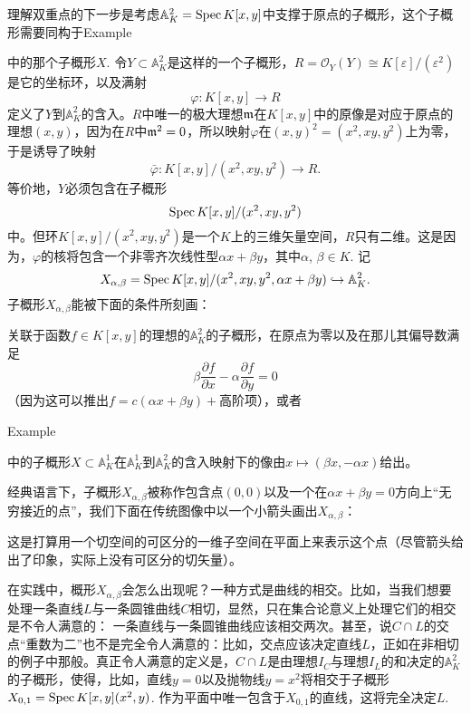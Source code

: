 \begin{exa}[双重点]
理解双重点的下一步是考虑$\mathbb{A}_K^2=\operatorname{Spec} K[x,y]$中支撑于原点的子概形，这个子概形需要同构于Example {{\addtocounter{thm}{-1}}\thethm{\addtocounter{thm}{1}}}中的那个子概形$X$. 令$Y\subset \mathbb{A}_K^2$是这样的一个子概形，$R=\mathscr{O}_Y(Y)\cong K[\varepsilon]/(\varepsilon^2)$是它的坐标环，以及满射
\[
	\varphi:K[x,y]\to R
\]
定义了$Y$到$\mathbb{A}_K^2$的含入。$R$中唯一的极大理想$\mathfrak{m}$在$K[x,y]$中的原像是对应于原点的理想$(x,y)$，因为在$R$中$\mathfrak{m}^2=0$，所以映射$\varphi$在$(x,y)^2=(x^2,xy,y^2)$上为零，于是诱导了映射
\[
	\bar\varphi:K[x,y]/(x^2,xy,y^2)\to R.
\]
等价地，$Y$必须包含在子概形
\[
	\operatorname{Spec} K[x,y]/(x^2,xy,y^2)
\]
中。但环$K[x,y]/(x^2,xy,y^2)$是一个$K$上的三维矢量空间，$R$只有二维。这是因为，$\varphi$的核将包含一个非零齐次线性型$\alpha x+\beta y$，其中$\alpha$, $\beta\in K$. 记
\[
	X_{\alpha,\beta}=\operatorname{Spec} K[x,y]/(x^2,xy,y^2,\alpha x+\beta y)\hookrightarrow \mathbb{A}_K^2.
\]
子概形$X_{\alpha,\beta}$能被下面的条件所刻画：

\begin{compactenum}[(i)]
\item 关联于函数$f\in K[x,y]$的理想的$\mathbb{A}^2_K$的子概形，在原点为零以及在那儿其偏导数满足
\[
	\beta\frac{\partial f}{\partial x}-\alpha\frac{\partial f}{\partial y}=0
\]
（因为这可以推出$f=c(\alpha x+\beta y)+\text{高阶项}$），或者
\item Example {{\addtocounter{thm}{-1}}\thethm{\addtocounter{thm}{1}}}中的子概形$X\subset \mathbb{A}_K^1$在$\mathbb{A}_K^1$到$\mathbb{A}_K^2$的含入映射下的像由$x\mapsto (\beta x,-\alpha x)$给出。
\end{compactenum}

经典语言下，子概形$X_{\alpha,\beta}$被称作包含点$(0,0)$以及一个在$\alpha x+\beta y=0$方向上“无穷接近的点”，我们下面在传统图像中以一个小箭头画出$X_{\alpha,\beta}$：


\noindent 这是打算用一个切空间的可区分的一维子空间在平面上来表示这个点（尽管箭头给出了印象，实际上没有可区分的切矢量）。\nottran
\end{exa}

在实践中，概形$X_{\alpha,\beta}$会怎么出现呢？一种方式是曲线的相交。比如，当我们想要处理一条直线$L$与一条圆锥曲线$C$相切，显然，只在集合论意义上处理它们的相交是不令人满意的：
一条直线与一条圆锥曲线应该相交两次。甚至，说$C\cap L$的交点“重数为二”也不是完全令人满意的：比如，交点应该决定直线$L$，正如在非相切的例子中那般。真正令人满意的定义是，$C\cap L$是由理想$I_C$与理想$I_L$的和决定的$\mathbb{A}_K^2$的子概形，使得，比如，直线$y=0$以及抛物线$y=x^2$将相交于子概形$X_{0,1}=\operatorname{Spec} K[x,y](x^2,y)$. 作为平面中唯一包含于$X_{0,1}$的直线，这将完全决定$L$. 

